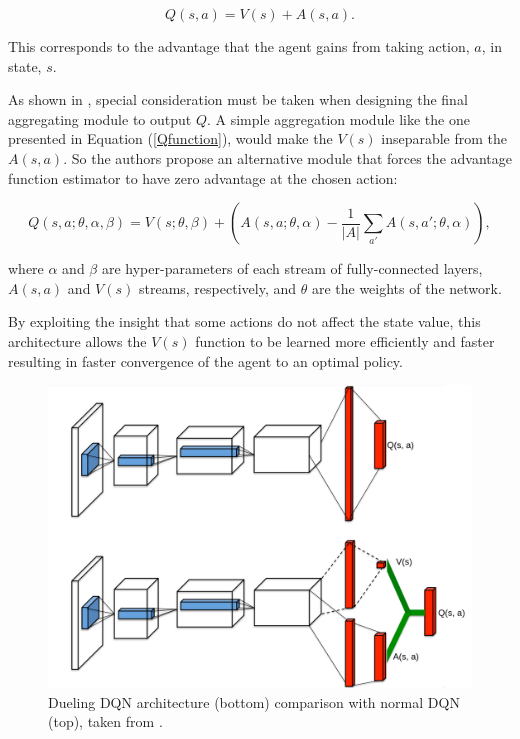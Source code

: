 \begin{equation}\label{Qfunction}
Q(s,a) = V(s)+A(s,a) .
\end{equation}

This corresponds to the advantage that the agent gains from taking action, $a$, in state, $s$. 

As shown in \cite{duelingDQN}, special consideration must be taken when designing the final aggregating module to output $Q$. A simple aggregation module like the one presented in Equation (\ref{Qfunction}), would make the $V(s)$ inseparable from the $A(s, a)$. So the authors propose an alternative module that forces the advantage function estimator to have zero advantage at the chosen action:

\begin{equation}
    Q(s,a;\theta,\alpha,\beta) = V(s; \theta, \beta) + (A(s,a;\theta,\alpha) - \frac{1}{|A|}\sum\limits_{a'}A(s, a'; \theta, \alpha)) ,
\end{equation}

where $\alpha$ and $\beta$ are hyper-parameters of each stream of fully-connected layers, $A(s,a)$ and $V(s)$ streams, respectively, and $\theta$ are the weights of the network.

By exploiting the insight that some actions do not affect the state value, this architecture allows the $V(s)$ function to be learned more efficiently and faster resulting in faster convergence of the agent to an optimal policy.

\begin{figure}[H]
  \centering
  \includegraphics[width=\textwidth]{images/duelingDQN.png}
  \caption{Dueling DQN architecture (bottom) comparison with normal DQN (top), taken from \cite{duelingDQN}.} \label{duelDQNImag}
\end{figure}


